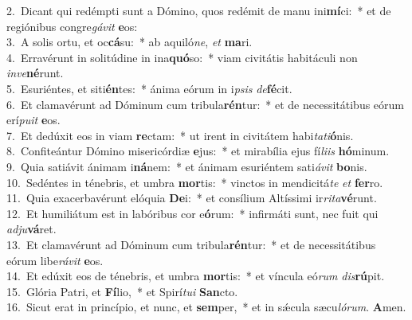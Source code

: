 {2.~}Dicant qui redémpti sunt a Dómino, quos redémit de manu ini\textbf{mí}ci:~* et de regiónibus congre\textit{gá}\textit{vit} \textbf{e}os:\\
{3.~}A solis ortu, et oc\textbf{cá}su:~* ab aquiló\textit{ne}, \textit{et} \textbf{ma}ri.\\
{4.~}Erravérunt in solitúdine in ina\textbf{quó}so:~* viam civitátis habitáculi non \textit{in}\textit{ve}\textbf{né}runt.\\
{5.~}Esuriéntes, et siti\textbf{én}tes:~* ánima eórum in i\textit{psis} \textit{de}\textbf{fé}cit.\\
{6.~}Et clamavérunt ad Dóminum cum tribula\textbf{rén}tur:~* et de necessitátibus eórum erí\textit{pu}\textit{it} \textbf{e}os.\\
{7.~}Et dedúxit eos in viam \textbf{re}ctam:~* ut irent in civitátem habi\textit{ta}\textit{ti}\textbf{ó}nis.\\
{8.~}Confiteántur Dómino misericórdiæ \textbf{e}jus:~* et mirabília ejus fí\textit{li}\textit{is} \textbf{hó}minum.\\
{9.~}Quia satiávit ánimam i\textbf{ná}nem:~* et ánimam esuriéntem sati\textit{á}\textit{vit} \textbf{bo}nis.\\
{10.~}Sedéntes in ténebris, et umbra \textbf{mor}tis:~* vinctos in mendicitá\textit{te} \textit{et} \textbf{fer}ro.\\
{11.~}Quia exacerbavérunt elóquia \textbf{De}i:~* et consílium Altíssimi ir\textit{ri}\textit{ta}\textbf{vé}runt.\\
{12.~}Et humiliátum est in labóribus cor e\textbf{ó}rum:~* infirmáti sunt, nec fuit qui \textit{ad}\textit{ju}\textbf{vá}ret.\\
{13.~}Et clamavérunt ad Dóminum cum tribula\textbf{rén}tur:~* et de necessitátibus eórum libe\textit{rá}\textit{vit} \textbf{e}os.\\
{14.~}Et edúxit eos de ténebris, et umbra \textbf{mor}tis:~* et víncula eó\textit{rum} \textit{dis}\textbf{rú}pit.\\
{15.~}Glória Patri, et \textbf{Fí}lio,~* et Spirí\textit{tu}\textit{i} \textbf{San}cto.\\
{16.~}Sicut erat in princípio, et nunc, et \textbf{sem}per,~* et in sǽcula sæcu\textit{ló}\textit{rum}. \textbf{A}men.\\
